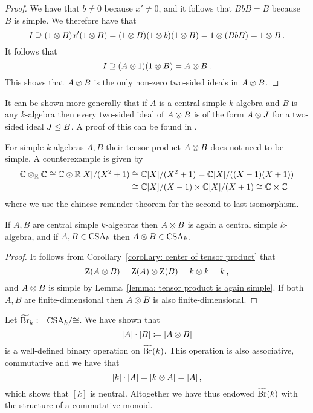 \begin{proof}
  We have that $b \neq 0$ because $x' \neq 0$, and it follows that $BbB = B$ because $B$ is simple.
  We therefore have that
  \[
              I
    \supseteq (1 \mathbin{\otimes} B) x' (1 \mathbin{\otimes} B)
    =         (1 \mathbin{\otimes} B) (1 \mathbin{\otimes} b) (1 \mathbin{\otimes} B)
    =         1 \mathbin{\otimes} (BbB)
    =         1 \mathbin{\otimes} B \,.
  \]
  It follows that
  \[
              I
    \supseteq (A \mathbin{\otimes} 1) (1 \mathbin{\otimes} B)
    =         A \mathbin{\otimes} B \,.
  \]
  This shows that $A \mathbin{\otimes} B$ is the only non-zero two-sided ideals in $A \mathbin{\otimes} B$.
\end{proof}


\begin{remark}
  It can be shown more generally that if $A$ is a central simple $k$-algebra and $B$ is any $k$-algebra then every two-sided ideal of $A \mathbin{\otimes} B$ is of the form $A \mathbin{\otimes} J$ for a two-sided ideal $J \trianglelefteq B$.
  A proof of this can be found in \cite[Lemma~4.1]{Clark2012NonCA}.
\end{remark}


\begin{warning}
  For simple $k$-algebras $A, B$ their tensor product $A \mathbin{\otimes} B$ does not need to be simple.
  A counterexample is given by
  \begin{align*}
            \mathbb{C} \mathbin{\otimes}_{\mathbb{R}} \mathbb{C}
     \cong  \mathbb{C} \mathbin{\otimes} \mathbb{R}[X]/(X^2 + 1)
    &\cong  \mathbb{C}[X]/(X^2 + 1)
     =      \mathbb{C}[X]/((X-1)(X+1))
    \\
    &\cong  \mathbb{C}[X]/(X-1) \times \mathbb{C}[X]/(X+1)
     \cong  \mathbb{C} \times \mathbb{C}
  \end{align*}
  where we use the chinese reminder theorem for the second to last isomorphism.
\end{warning}


\begin{proposition}
  If $A, B$ are central simple $k$-algebras then $A \mathbin{\otimes} B$ is again a central simple $k$-algebra, and if $A, B \in \operatorname{CSA}_k$ then $A \mathbin{\otimes} B \in \operatorname{CSA}_k$.
\end{proposition}


\begin{proof}
  It follows from Corollary~\ref{corollary: center of tensor product} that
  \[
      \operatorname{Z}(A \mathbin{\otimes} B)
    = \operatorname{Z}(A) \mathbin{\otimes} \operatorname{Z}(B)
    = k \mathbin{\otimes} k
    = k \,,
  \]
  and $A \mathbin{\otimes} B$ is simple by Lemma~\ref{lemma: tensor product is again simple}.
  If both $A, B$ are finite-dimensional then $A \mathbin{\otimes} B$ is also finite-dimensional.
\end{proof}


\begin{fluff}
  Let $\widetilde{\operatorname{Br}}_k \coloneqq \operatorname{CSA}_k\!/{\cong}$.
  We have shown that
  \[
              [A] \cdot [B]
    \coloneqq  [A \mathbin{\otimes} B]
  \]
  is a well-defined binary operation on $\widetilde{\operatorname{Br}}(k)$.
  This operation is also associative, commutative and we have that
  \[
      [k] \cdot [A]
    = [k \mathbin{\otimes} A]
    = [A] \,,
  \]
  which shows that $[k]$ is neutral.
  Altogether we have thus endowed $\widetilde{\operatorname{Br}}(k)$ with the structure of a commutative monoid.
\end{fluff}




